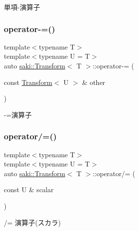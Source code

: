 単項-\/演算子 

\mbox{\label{classsaki_1_1_transform_a27f9b6f3571fb0a44ca36ef51080a1d3}} 
\subsubsection{\texorpdfstring{operator-\/=()}{operator-=()}}
{\footnotesize\ttfamily template$<$typename T$>$ \\
template$<$typename U  = T$>$ \\
auto \mbox{\hyperlink{classsaki_1_1_transform}{saki\+::\+Transform}}$<$ T $>$\+::operator-\/= (\begin{DoxyParamCaption}\item[{const \mbox{\hyperlink{classsaki_1_1_transform}{Transform}}$<$ U $>$ \&}]{other }\end{DoxyParamCaption})\hspace{0.3cm}{\ttfamily [inline]}}



-\/=演算子 

\mbox{\label{classsaki_1_1_transform_a9a5559fdf626c8ecec063db74c6f4f8e}} 
\subsubsection{\texorpdfstring{operator/=()}{operator/=()}}
{\footnotesize\ttfamily template$<$typename T$>$ \\
template$<$typename U  = T$>$ \\
auto \mbox{\hyperlink{classsaki_1_1_transform}{saki\+::\+Transform}}$<$ T $>$\+::operator/= (\begin{DoxyParamCaption}\item[{const U \&}]{scalar }\end{DoxyParamCaption})\hspace{0.3cm}{\ttfamily [inline]}}



/= 演算子(スカラ) 

\mbox{\label{classsaki_1_1_transform_acfdf423e01196edf631f272400645cfa}} 
